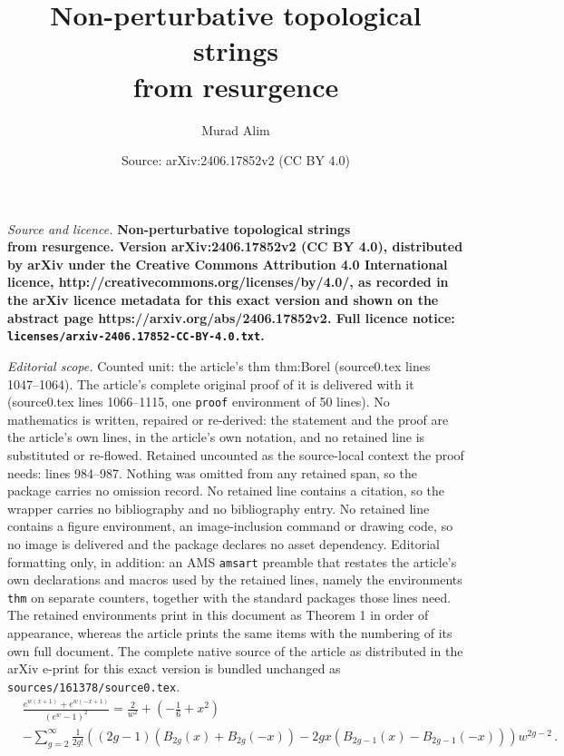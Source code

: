 \documentclass[10pt,a4paper]{amsart}
\title{\bf{Non-perturbative topological strings\\ from resurgence}}
\author{Murad Alim}
\date{Source: arXiv:2406.17852v2 (CC BY 4.0)}
\begin{document}
\maketitle

\noindent\emph{Source and licence.} \bf{Non-perturbative topological strings\\ from resurgence}. Version arXiv:2406.17852v2 (CC BY 4.0), distributed by arXiv under the Creative Commons Attribution 4.0 International licence, http://creativecommons.org/licenses/by/4.0/, as recorded in the arXiv licence metadata for this exact version and shown on the abstract page https://arxiv.org/abs/2406.17852v2. Full licence notice: \texttt{licenses/arxiv-2406.17852-CC-BY-4.0.txt}.\par\smallskip

\noindent\textit{Editorial scope.} Counted unit: the article's thm thm:Borel (source0.tex lines 1047--1064). The article's complete original proof of it is delivered with it (source0.tex lines 1066--1115, one \texttt{proof} environment of 50 lines). No mathematics is written, repaired or re-derived: the statement and the proof are the article's own lines, in the article's own notation, and no retained line is substituted or re-flowed.  Retained uncounted as the source-local context the proof needs: lines 984--987.  Nothing was omitted from any retained span, so the package carries no omission record.  No retained line contains a citation, so the wrapper carries no bibliography and no bibliography entry.  No retained line contains a figure environment, an image-inclusion command or drawing code, so no image is delivered and the package declares no asset dependency.  Editorial formatting only, in addition: an AMS \texttt{amsart} preamble that restates the article's own declarations and macros used by the retained lines, namely the environments \texttt{thm} on separate counters, together with the standard packages those lines need.  The retained environments print in this document as Theorem 1 in order of appearance, whereas the article prints the same items with the numbering of its own full document.  The complete native source of the article as distributed in the arXiv e-print for this exact version is bundled unchanged as \texttt{sources/161378/source0.tex}.
\begin{align}\label{eq:symBern}
&\frac{e^{w(x+1)}+e^{w(-x+1)}}{ (e^w-1)^2} = \frac{2}{w^2}+ \left( -\frac{1}{6}+x^2\right)  \nonumber \\ 
&- \sum_{g=2}^{\infty}  \frac{1}{2g!} \left(  (2g-1) (B_{2g}(x)+B_{2g}(-x))- 2g x (B_{2g-1}(x)-B_{2g-1}(-x))\right)  w^{2g-2}\,.
\end{align}
\end{document}
